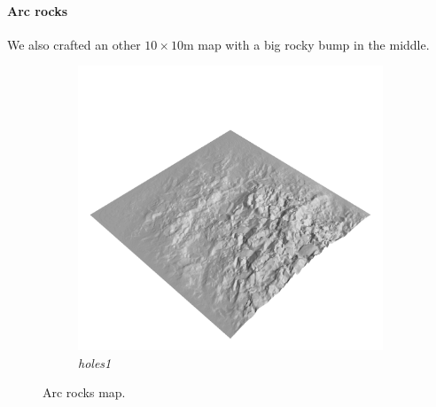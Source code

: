 \documentclass[../document.tex]{subfiles}
\begin{document}
\paragraph{Arc rocks} We also crafted an other $10\times10$m map with a big rocky bump in the middle. 
\begin{figure}[H]
    \centering
        \begin{subfigure}[b]{0.23\textwidth}
            \includegraphics[width=\textwidth]{../img/hm3d/arc_rocks.png}
            \caption{\emph{holes1}}
        \end{subfigure}
\caption{Arc rocks map.}
\label{fig : arc-rocks}
\end{figure}
\end{document}
